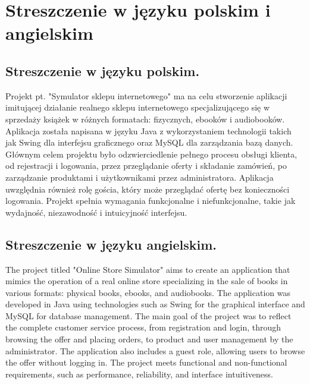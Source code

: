 \chapter{Streszczenie w języku polskim i angielskim}
\label{cha:Streszczenie}

\section{Streszczenie w języku polskim.}

Projekt pt. "Symulator sklepu internetowego" ma na celu stworzenie aplikacji imitującej działanie realnego sklepu internetowego specjalizującego 
się w sprzedaży książek w różnych formatach: fizycznych, ebooków i audiobooków. Aplikacja została napisana w języku Java z wykorzystaniem technologii 
takich jak Swing dla interfejsu graficznego oraz MySQL dla zarządzania bazą danych. Głównym celem projektu było odzwierciedlenie pełnego procesu obsługi 
klienta, od rejestracji i logowania, przez przeglądanie oferty i składanie zamówień, po zarządzanie produktami i użytkownikami przez administratora. 
Aplikacja uwzględnia również rolę gościa, który może przeglądać ofertę bez konieczności logowania. Projekt spełnia wymagania funkcjonalne i niefunkcjonalne, 
takie jak wydajność, niezawodność i intuicyjność interfejsu.

\section{Streszczenie w języku angielskim.}

The project titled "Online Store Simulator" aims to create an application that mimics the operation of a real online store specializing in 
the sale of books in various formats: physical books, ebooks, and audiobooks. The application was developed in Java using technologies such as
 Swing for the graphical interface and MySQL for database management. The main goal of the project was to reflect the complete customer service process, 
 from registration and login, through browsing the offer and placing orders, to product and user management by the administrator. The application also includes a
  guest role, allowing users to browse the offer without logging in. The project meets functional and non-functional requirements, such as performance, reliability,
   and interface intuitiveness.